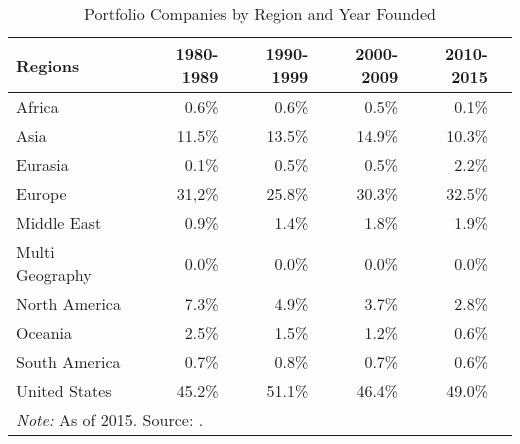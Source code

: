 
\begin{table}[ht]
    \caption{\label{tab:pcritablea3} Portfolio Companies by Region and Year Founded}\tabularnewline
    
    \begin{tabular}{@{}lrrrrr@{}}
    \toprule
    Regions & 1980-1989 & 1990-1999 & 2000-2009 & 2010-2015\tabularnewline
    \midrule
    Africa & 0.6\% & 0.6\% & 0.5\% & 0.1\%\tabularnewline
    Asia & 11.5\% & 13.5\% & 14.9\% & 10.3\%\tabularnewline
    Eurasia & 0.1\% & 0.5\% & 0.5\% & 2.2\%\tabularnewline
    Europe & 31,2\% & 25.8\% & 30.3\% & 32.5\%\tabularnewline
    Middle East & 0.9\% & 1.4\% & 1.8\% & 1.9\%\tabularnewline
    Multi Geography & 0.0\% & 0.0\% & 0.0\% & 0.0\%\tabularnewline
    North America & 7.3\% & 4.9\% & 3.7\% & 2.8\%\tabularnewline
    Oceania & 2.5\% & 1.5\% & 1.2\% & 0.6\%\tabularnewline
    South America & 0.7\% & 0.8\% & 0.7\% & 0.6\%\tabularnewline
    United States & 45.2\% & 51.1\% & 46.4\% & 49.0\%\tabularnewline
    \bottomrule
    \multicolumn{6}{l}{\textit{Note: } As of 2015. Source: \citet{jeng2015}.}\tabularnewline
    \end{tabular}
\end{table}